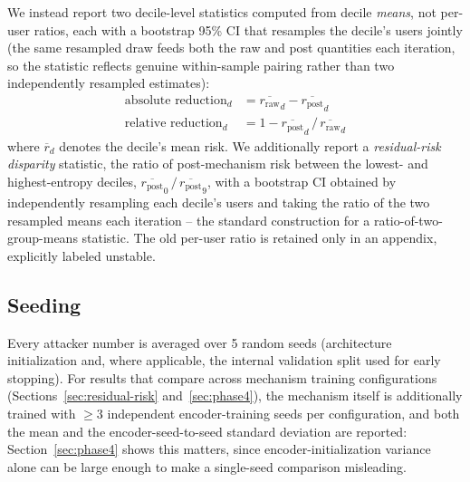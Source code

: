 We instead report two decile-level statistics computed from decile
\emph{means}, not per-user ratios, each with a bootstrap 95\% CI that
resamples the decile's users jointly (the same resampled draw feeds
both the raw and post quantities each iteration, so the statistic
reflects genuine within-sample pairing rather than two independently
resampled estimates):
\begin{align}
\text{absolute reduction}_d &= \overline{r_{\mathrm{raw}}}_d - \overline{r_{\mathrm{post}}}_d \\
\text{relative reduction}_d &= 1 - \overline{r_{\mathrm{post}}}_d \,/\, \overline{r_{\mathrm{raw}}}_d
\end{align}
where $\overline{r}_d$ denotes the decile's mean risk. We additionally
report a \emph{residual-risk disparity} statistic, the ratio of
post-mechanism risk between the lowest- and highest-entropy deciles,
$\overline{r_{\mathrm{post}}}_0 \,/\, \overline{r_{\mathrm{post}}}_9$,
with a bootstrap CI obtained by independently resampling each decile's
users and taking the ratio of the two resampled means each iteration --
the standard construction for a ratio-of-two-group-means statistic. The
old per-user ratio is retained only in an appendix, explicitly labeled
unstable.

\subsection{Seeding}
\label{sec:seeding}
Every attacker number is averaged over 5 random seeds (architecture
initialization and, where applicable, the internal validation split
used for early stopping). For results that compare across mechanism
training configurations (Sections~\ref{sec:residual-risk}
and~\ref{sec:phase4}), the mechanism itself is additionally trained
with $\geq 3$ independent encoder-training seeds per configuration, and
both the mean and the encoder-seed-to-seed standard deviation are
reported: Section~\ref{sec:phase4} shows this matters, since
encoder-initialization variance alone can be large enough to make a
single-seed comparison misleading.
